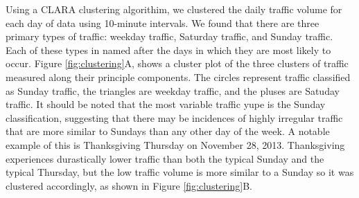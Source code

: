 \documentclass{report}
\begin{document}
Using a CLARA clustering algorithim, we clustered the daily traffic volume
for each day of data using 10-minute intervals. We found that there are three
primary types of traffic: weekday traffic, Saturday traffic, and Sunday traffic.
Each of these types in named after the days in which they are most likely to
occur. Figure \ref{fig:clustering}A, shows a cluster plot of the three clusters
of traffic measured along their principle components. The circles represent
traffic classified as Sunday traffic, the triangles are weekday traffic, and
the pluses are Satuday traffic. It should be noted that the most variable traffic
yupe is the Sunday classification, suggesting that there may be incidences of
highly irregular traffic that are more similar to Sundays than any other day
of the week. A notable example of this is Thanksgiving Thursday on November 28,
2013. Thanksgiving experiences durastically lower traffic than both the typical
Sunday and the typical Thursday, but the low traffic volume is more similar to
a Sunday so it was clustered accordingly, as shown in Figure \ref{fig:clustering}B.
\end{document}
